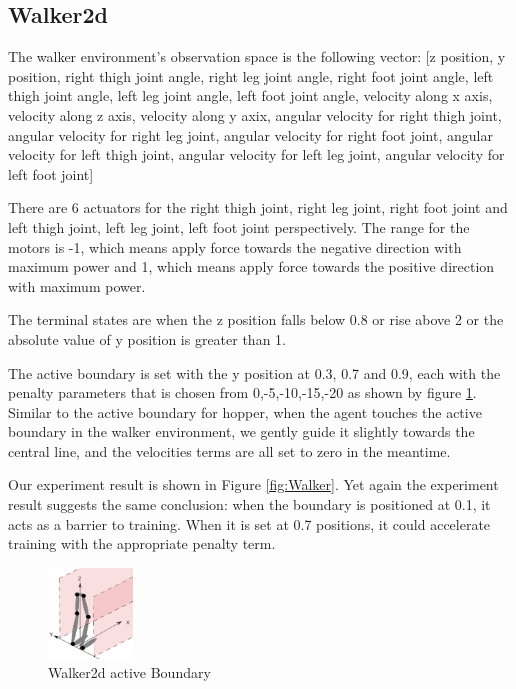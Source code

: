 \documentclass[journal]{IEEEtran}
\begin{document}
\subsection{Walker2d}
The walker environment's observation space is the following vector: [z position, y position, right thigh joint angle, right leg joint angle, right foot joint angle, left thigh joint angle, left leg joint angle, left foot joint angle, velocity along x axis, velocity along z axis, velocity along y axix, angular velocity for right thigh joint, angular velocity for right leg joint, angular velocity for right foot joint, angular velocity for left thigh joint, angular velocity for left leg joint, angular velocity for left foot joint]

There are 6 actuators for the right thigh joint, right leg joint, right foot joint and left thigh joint, left leg joint, left foot joint perspectively. The range for the motors is -1, which means apply force towards the negative direction with maximum power and 1, which means apply force towards the positive direction with maximum power.

The terminal states are when the z position falls below 0.8 or rise above 2 or the absolute value of y position is greater than 1.

The active boundary is set with the y position at 0.3, 0.7 and 0.9, each with the penalty parameters that is chosen from 0,-5,-10,-15,-20 as shown by figure \ref{fig:walkerPB}. Similar to the active boundary for hopper, when the agent touches the active boundary in the walker environment, we gently guide it slightly towards the central line, and the velocities terms are all set to zero in the meantime.

Our experiment result is shown in Figure \ref{fig:Walker}. Yet again the experiment result suggests the same conclusion: when the boundary is positioned at 0.1, it acts as a barrier to training. When it is set at 0.7 positions, it could accelerate training with the appropriate penalty term.

\begin{figure}
     \centering
      \includegraphics[width=0.2\textwidth]{walker.png}
      \caption{Walker2d active Boundary}
      \label{fig:walkerPB}
\end{figure}
\end{document}
